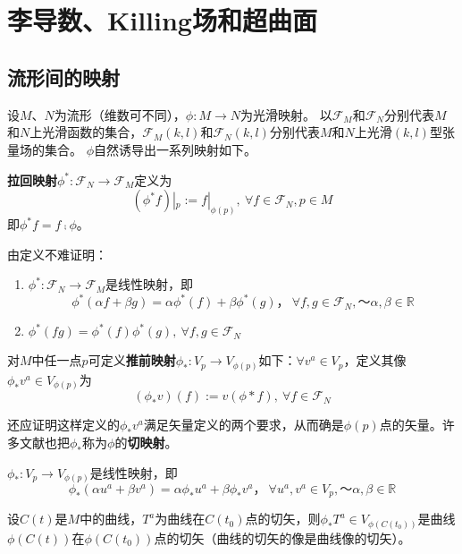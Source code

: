 \chapter[李导数、Killing场和超曲面]{\\李导数、Killing场和超曲面}

\section{流形间的映射}

设$M$、$N$为流形（维数可不同），$\phi \colon M \to N$为光滑映射。
以$\mathscr{F}_M$和$\mathscr{F}_N$分别代表$M$和$N$上光滑函数的集合，$\mathscr{F}_M(k, l)$和$\mathscr{F}_N(k, l)$分别代表$M$和$N$上光滑$(k,l)$型张量场的集合。
$\phi$自然诱导出一系列映射如下。

\begin{definition}
\textbf{拉回映射}$\phi^* \colon \mathscr{F}_N \to \mathscr{F}_M$定义为
$$(\phi^*f)|_p := f|_{\phi(p)}, ~ \forall f \in \mathscr{F}_N, p \in M$$
即$\phi^*f = f \comp \phi$。
\end{definition}

由定义不难证明：
\begin{enumerate}[（1）]
\item $\phi^* \colon \mathscr{F}_N \to \mathscr{F}_M$是线性映射，即
$$\phi^*(\alpha f + \beta g) = \alpha\phi^*(f) + \beta\phi^*(g)， ~ \forall f,g \in \mathscr{F}_N, ～ \alpha,\beta \in \mathbb{R}$$
\item $\phi^*(fg) = \phi^*(f)\phi^*(g), ~ \forall f,g \in \mathscr{F}_N$
\end{enumerate}

\begin{definition}
对$M$中任一点$p$可定义\textbf{推前映射}$\phi_* \colon V_p \to V_{\phi(p)}$如下：$\forall v^a \in V_p$，定义其像$\phi_*v^a \in V_{\phi(p)}$为
$$(\phi_*v)(f) := v(\phi*f), ~ \forall f \in \mathscr{F}_N$$
\end{definition}

还应证明这样定义的$\phi_*v^a$满足矢量定义的两个要求，从而确是$\phi(p)$点的矢量。许多文献也把$\phi_*$称为$\phi$的\textbf{切映射}。

\begin{theorem}
$\phi_* \colon V_p \to V_{\phi(p)}$是线性映射，即
$$\phi_*(\alpha u^a + \beta v^a) = \alpha\phi_*u^a + \beta\phi_*v^a， ~ \forall u^a,v^a \in V_p, ～ \alpha,\beta \in \mathbb{R}$$
\end{theorem}

\begin{theorem}
设$C(t)$是$M$中的曲线，$T^a$为曲线在$C(t_0)$点的切矢，则$\phi_*T^a \in V_{\phi(C(t_0))}$是曲线$\phi(C(t))$在$\phi(C(t_0))$点的切矢（曲线的切矢的像是曲线像的切矢）。
\end{theorem}

